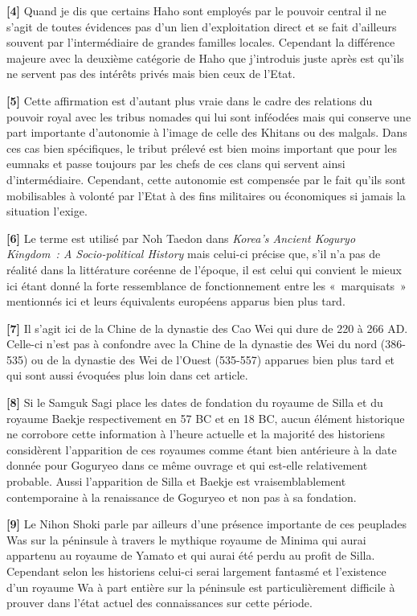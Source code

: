 \documentclass[11pt,a4paper]{article}
\begin{document}
\textbf{{[}4{]}} Quand je dis que certains Haho sont employés par le pouvoir central il ne s'agit de toutes évidences pas d'un lien d'exploitation direct et se fait d'ailleurs souvent par l'intermédiaire de grandes familles locales. Cependant la différence majeure avec la deuxième catégorie de Haho que j'introduis juste après est qu'ils ne servent pas des intérêts privés mais bien ceux de l'Etat.

\textbf{{[}5{]}} Cette affirmation est d'autant plus vraie dans le cadre des relations du pouvoir royal avec les tribus nomades qui lui sont inféodées mais qui conserve une part importante d'autonomie à l'image de celle des Khitans ou des malgals. Dans ces cas bien spécifiques, le tribut prélevé est bien moins important que pour les eumnaks et passe toujours par les chefs de ces clans qui servent ainsi d'intermédiaire. Cependant, cette autonomie est compensée par le fait qu'ils sont mobilisables à volonté par l'Etat à des fins militaires ou économiques si jamais la situation l'exige.

\textbf{{[}6{]}} Le terme est utilisé par Noh Taedon dans \emph{Korea's Ancient Koguryo Kingdom~: A Socio-political History} mais celui-ci précise que, s'il n'a pas de réalité dans la littérature coréenne de l'époque, il est celui qui convient le mieux ici étant donné la forte ressemblance de fonctionnement entre les «~marquisats~» mentionnés ici et leurs équivalents européens apparus bien plus tard.

\textbf{{[}7{]}} Il s'agit ici de la Chine de la dynastie des Cao Wei qui dure de 220 à 266 AD. Celle-ci n'est pas à confondre avec la Chine de la dynastie des Wei du nord (386-535) ou de la dynastie des Wei de l'Ouest (535-557) apparues bien plus tard et qui sont aussi évoquées plus loin dans cet article.

\textbf{{[}8{]}} Si le Samguk Sagi place les dates de fondation du royaume de Silla et du royaume Baekje respectivement en 57 BC et en 18 BC, aucun élément historique ne corrobore cette information à l'heure actuelle et la majorité des historiens considèrent l'apparition de ces royaumes comme étant bien antérieure à la date donnée pour Goguryeo dans ce même ouvrage et qui est-elle relativement probable. Aussi l'apparition de Silla et Baekje est vraisemblablement contemporaine à la renaissance de Goguryeo et non pas à sa fondation.

\textbf{{[}9{]}} Le Nihon Shoki parle par ailleurs d'une présence importante de ces peuplades Was sur la péninsule à travers le mythique royaume de Minima qui aurai appartenu au royaume de Yamato et qui aurai été perdu au profit de Silla. Cependant selon les historiens celui-ci serai largement fantasmé et l'existence d'un royaume Wa à part entière sur la péninsule est particulièrement difficile à prouver dans l'état actuel des connaissances sur cette période.
\end{document}
